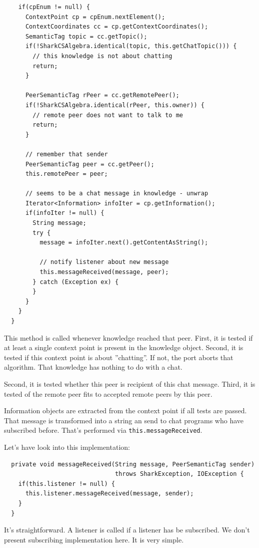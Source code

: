 {\begin{verbatim}
    if(cpEnum != null) {
      ContextPoint cp = cpEnum.nextElement();
      ContextCoordinates cc = cp.getContextCoordinates();
      SemanticTag topic = cc.getTopic();
      if(!SharkCSAlgebra.identical(topic, this.getChatTopic())) {
        // this knowledge is not about chatting
        return;
      }

      PeerSemanticTag rPeer = cc.getRemotePeer();
      if(!SharkCSAlgebra.identical(rPeer, this.owner)) {
        // remote peer does not want to talk to me 
        return;
      }

      // remember that sender
      PeerSemanticTag peer = cc.getPeer();
      this.remotePeer = peer;

      // seems to be a chat message in knowledge - unwrap
      Iterator<Information> infoIter = cp.getInformation();
      if(infoIter != null) {
        String message;
        try {
          message = infoIter.next().getContentAsString();

          // notify listener about new message
          this.messageReceived(message, peer);
        } catch (Exception ex) {
        }
      }
    }
  }
\end{verbatim}

This method is called whenever knowledge reached that peer. First, it is tested if at least a single context point is present in the knowledge object. Second, it is tested if this context point is about ''chatting''. If not, the port aborts that algorithm. That knowledge has nothing to do with a chat.

Second, it is tested whether this peer is recipient of this chat message. Third, it is tested of the remote peer fits to accepted remote peers by this peer.

Information objects are extracted from the context point if all tests are passed. That message is transformed into a string an send to chat programs who have subscribed before. That's performed via {\tt this.messageReceived}.

Let's have look into this implementation:
\begin{verbatim}
  private void messageReceived(String message, PeerSemanticTag sender) 
                               throws SharkException, IOException {
    if(this.listener != null) {
      this.listener.messageReceived(message, sender);
    }
  }
\end{verbatim}

It's straightforward. A listener is called if a listener has be subscribed. We don't present subscribing implementation here. It is very simple.

}
